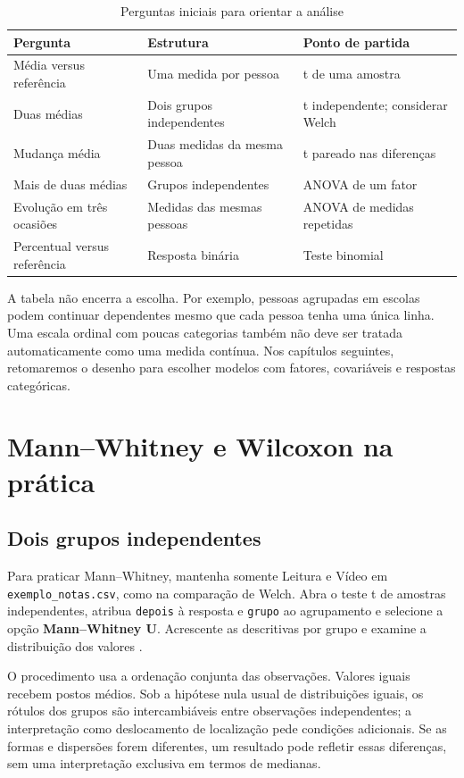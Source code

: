 \begin{table}[H]
\centering
\caption{Perguntas iniciais para orientar a análise}
\begin{tabular}{p{}p{}p{}}
\hline
Pergunta & Estrutura & Ponto de partida \\
\hline
Média versus referência & Uma medida por pessoa & t de uma amostra \\
Duas médias & Dois grupos independentes & t independente; considerar Welch \\
Mudança média & Duas medidas da mesma pessoa & t pareado nas diferenças \\
Mais de duas médias & Grupos independentes & ANOVA de um fator \\
Evolução em três ocasiões & Medidas das mesmas pessoas & ANOVA de medidas repetidas \\
Percentual versus referência & Resposta binária & Teste binomial \\
\hline
\end{tabular}
\label{tab:perguntas-testes}
\end{table}

A tabela não encerra a escolha. Por exemplo, pessoas agrupadas em escolas podem continuar dependentes mesmo que cada pessoa tenha uma única linha. Uma escala ordinal com poucas categorias também não deve ser tratada automaticamente como uma medida contínua. Nos capítulos seguintes, retomaremos o desenho para escolher modelos com fatores, covariáveis e respostas categóricas.

\section{Mann--Whitney e Wilcoxon na prática}

\subsection{Dois grupos independentes}

Para praticar Mann--Whitney, mantenha somente Leitura e Vídeo em \texttt{exemplo\_notas.csv}, como na comparação de Welch. Abra o teste t de amostras independentes, atribua \texttt{depois} à resposta e \texttt{grupo} ao agrupamento e selecione a opção \textbf{Mann--Whitney U}. Acrescente as descritivas por grupo e examine a distribuição dos valores \parencite{JamoviTIndependente}.

O procedimento usa a ordenação conjunta das observações. Valores iguais recebem postos médios. Sob a hipótese nula usual de distribuições iguais, os rótulos dos grupos são intercambiáveis entre observações independentes; a interpretação como deslocamento de localização pede condições adicionais. Se as formas e dispersões forem diferentes, um resultado pode refletir essas diferenças, sem uma interpretação exclusiva em termos de medianas.


